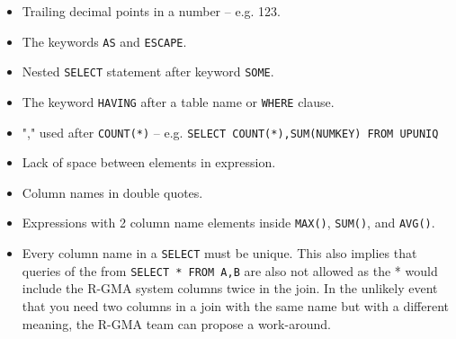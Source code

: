 \begin{itemize}
\item
Trailing decimal points in a number -- e.g. 123.

\item 
The keywords \texttt{AS} and \texttt{ESCAPE}.

\item
Nested \texttt{SELECT} statement after keyword \texttt{SOME}.

\item 
The keyword  \texttt{HAVING} after a table name or  \texttt{WHERE} clause.

\item
"," used after  \texttt{COUNT(*)} -- e.g. \texttt{SELECT
  COUNT(*),SUM(NUMKEY) FROM UPUNIQ}

\item
Lack of space between elements in expression.

\item
Column names in double quotes.

\item
Expressions with 2 column name elements inside \texttt{MAX()},
\texttt{SUM()}, and \texttt{AVG()}.

\item Every column name in a \texttt{SELECT} must be unique. This also
implies that queries of the from \texttt{SELECT * FROM A,B} are also
not allowed as the * would include the R-GMA system columns twice in
the join. In the unlikely event that you need two columns in a join
with the same name but with a different meaning, the R-GMA team can
propose a work-around.

\end{itemize}

